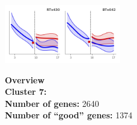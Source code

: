 \begin{multicols}{2}
\includegraphics[width=2in]{figures/clusters/leaf_Postflowering_6.png}
\columnbreak

\noindent \textbf{Overview}\\\textbf{Cluster 7:}  \\
\textbf{Number of genes:} 2640 \\
\textbf{Number of ``good'' genes:} 1374 \\
\end{multicols}

